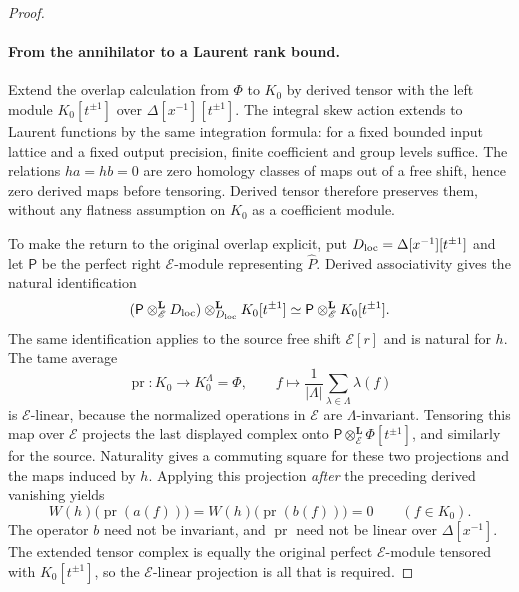 \begin{proof}
\paragraph{From the annihilator to a Laurent rank bound.}
Extend the overlap calculation from $\Phi$ to $K_0$ by derived
tensor with the left module $K_0[t^{\pm1}]$ over
$\Delta[x^{-1}][t^{\pm1}]$.  The integral skew action extends to
Laurent functions by the same integration formula: for a fixed
bounded input lattice and a fixed output precision, finite
coefficient and group levels suffice.
The relations $ha=hb=0$ are zero homology classes of maps out of
a free shift, hence zero derived maps before tensoring.  Derived
tensor therefore preserves them, without any flatness assumption
on $K_0$ as a coefficient module.

To make the return to the original overlap explicit, put
$D_{\rm loc}=\Delta[x^{-1}][t^{\pm1}]$ and let $\mathsf P$
be the perfect right $\mathscr E$-module representing $\widehat P$.
Derived associativity gives the natural identification
\[
 (\mathsf P\otimes^{\mathbf L}_{\mathscr E}D_{\rm loc})
       \otimes^{\mathbf L}_{D_{\rm loc}}K_0[t^{\pm1}]
 \simeq
 \mathsf P\otimes^{\mathbf L}_{\mathscr E}K_0[t^{\pm1}].
\]
The same identification applies to the source free shift
$\mathscr E[r]$ and is natural for $h$.
The tame average
\[
 \operatorname{pr}:K_0\longrightarrow K_0^\Lambda=\Phi,
 \qquad f\longmapsto\frac1{|\Lambda|}
                  \sum_{\lambda\in\Lambda}\lambda(f)
\]
is $\mathscr E$-linear, because the normalized operations in
$\mathscr E$ are $\Lambda$-invariant. Tensoring this map over
$\mathscr E$ projects the last displayed complex onto
$\mathsf P\otimes^{\mathbf L}_{\mathscr E}\Phi[t^{\pm1}]$,
and similarly for the source. Naturality gives a commuting square
for these two projections and the maps induced by $h$.
Applying this projection \emph{after} the preceding derived
vanishing yields
\begin{equation}
\label{obs:projected-annihilation}
 W(h)\bigl(\operatorname{pr}(a(f))\bigr)
 =W(h)\bigl(\operatorname{pr}(b(f))\bigr)=0
 \qquad(f\in K_0).
\end{equation}
The operator $b$ need not be invariant, and $\operatorname{pr}$ need
not be linear over $\Delta[x^{-1}]$.  The extended tensor complex
is equally the original perfect $\mathscr E$-module tensored
with $K_0[t^{\pm1}]$, so the $\mathscr E$-linear projection is
all that is required.


\end{proof}
